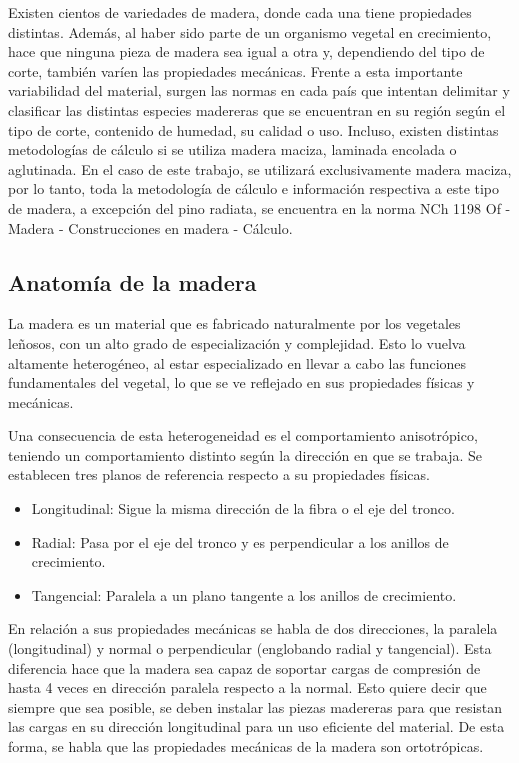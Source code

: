 Existen cientos de variedades de madera, donde cada una tiene propiedades distintas. Además, al haber sido parte de un organismo vegetal en crecimiento, hace que ninguna pieza de madera sea igual a otra y, dependiendo del tipo de corte, también varíen las propiedades mecánicas. Frente a esta importante variabilidad del material, surgen las normas en cada país que intentan delimitar y clasificar las distintas especies madereras que se encuentran en su región según el tipo de corte, contenido de humedad, su calidad o uso. Incluso, existen distintas metodologías de cálculo si se utiliza madera maciza, laminada encolada o aglutinada. En el caso de este trabajo, se utilizará exclusivamente madera maciza, por lo tanto, toda la metodología de cálculo e información respectiva a este tipo de madera, a excepción del pino radiata, se encuentra en la norma NCh 1198 Of - Madera - Construcciones en madera - Cálculo.

\subsection{Anatomía de la madera}
La madera es un material que es fabricado naturalmente por los vegetales leñosos, con un alto grado de especialización y complejidad. Esto lo vuelva altamente heterogéneo, al estar especializado en llevar a cabo las funciones fundamentales del vegetal, lo que se ve reflejado en sus propiedades físicas y mecánicas. 

Una consecuencia de esta heterogeneidad es el comportamiento anisotrópico, teniendo un comportamiento distinto según la dirección en que se trabaja. Se establecen tres planos de referencia respecto a su propiedades físicas.
\begin{itemize}
	\item Longitudinal: Sigue la misma dirección de la fibra o el eje del tronco.
	\item Radial: Pasa por el eje del tronco y es perpendicular a los anillos de crecimiento.
	\item Tangencial: Paralela a un plano tangente a los anillos de crecimiento.
\end{itemize}
En relación a sus propiedades mecánicas se habla de dos direcciones, la paralela (longitudinal) y normal o perpendicular (englobando radial y tangencial). Esta diferencia hace que la madera sea capaz de soportar cargas de compresión de hasta 4 veces en dirección paralela respecto a la normal. Esto quiere decir que siempre que sea posible, se deben instalar las piezas madereras para que resistan las cargas en su dirección longitudinal para un uso eficiente del material. De esta forma, se habla que las propiedades mecánicas de la madera son ortotrópicas.

